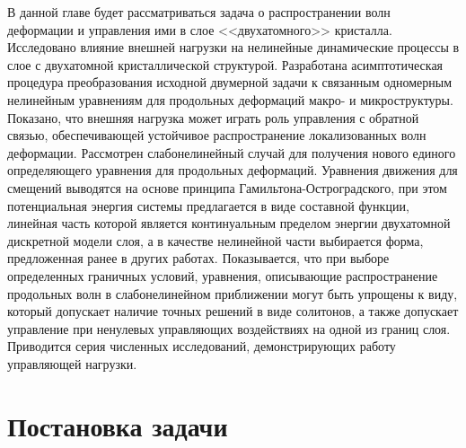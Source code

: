 В данной главе будет рассматриваться задача о распространении волн деформации и управления ими в слое <<двухатомного>> кристалла. Исследовано влияние внешней нагрузки на нелинейные динамические процессы в слое с двухатомной кристаллической структурой. Разработана асимптотическая процедура преобразования исходной двумерной задачи к связанным одномерным нелинейным уравнениям для продольных деформаций макро- и микроструктуры. Показано, что внешняя нагрузка может играть роль управления с обратной связью, обеспечивающей устойчивое распространение локализованных волн деформации. Рассмотрен слабонелинейный случай для получения нового единого определяющего уравнения для продольных деформаций. Уравнения движения для смещений выводятся на основе принципа Гамильтона-Остроградского, при этом потенциальная энергия системы предлагается в виде составной функции, линейная часть которой является континуальным пределом энергии двухатомной дискретной модели слоя, а в качестве нелинейной части выбирается форма, предложенная ранее в других работах. Показывается, что при выборе определенных граничных условий, уравнения, описывающие распространение продольных волн в слабонелинейном приближении могут быть упрощены к виду, который допускает наличие точных решений в виде солитонов, а также допускает управление при ненулевых управляющих воздействиях на одной из границ слоя. Приводится серия численных исследований, демонстрирующих работу управляющей нагрузки.


\section{Постановка задачи}

